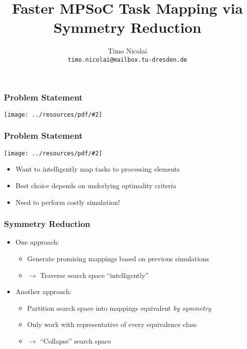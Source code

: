 \documentclass{beamer}
\newcommand{\includeressource}[2][]{\texttt{[image: ../resources/pdf/\#2]}}
\begin{document}
\title{Faster MPSoC Task Mapping via\\Symmetry Reduction}
\author{Timo Nicolai\\\texttt{timo.nicolai@mailbox.tu-dresden.de}}

\begin{frame}
\titlepage
\end{frame}

\begin{frame}
  \frametitle{Problem Statement}

  \begin{center}
    \includeressource[width=.5\linewidth]{regular_mesh_m_n.pdf}
  \end{center}
\end{frame}

\begin{frame}
  \frametitle{Problem Statement}

  \begin{center}
    \includeressource[width=.3\linewidth]{regular_mesh_m_n.pdf}
  \end{center}

  \begin{itemize}
    \item<1-> Want to intelligently map tasks to processing elements
    \item<2-> Best choice depends on underlying optimality criteria
    \item<3-> Need to perform costly simulation!
  \end{itemize}
\end{frame}

\begin{frame}
  \frametitle{Symmetry Reduction}

  \begin{itemize}
    \setlength\itemsep{.5cm}
    \item<1-> One approach:
      \begin{itemize}
        \item<1-> Generate promising mappings based on previous simulations
        \item<2-> $\rightarrow$ Traverse search space ``intelligently''
      \end{itemize}
    \item<3-> Another approach:
      \begin{itemize}
        \item<3-> Partition search space into mappings equivalent \textit{by symmetry}
        \item<4-> Only work with representative of every equivalence class
        \item<5-> $\rightarrow$ ``Collapse'' search space
       \end{itemize}
  \end{itemize}
\end{frame}
\end{document}
